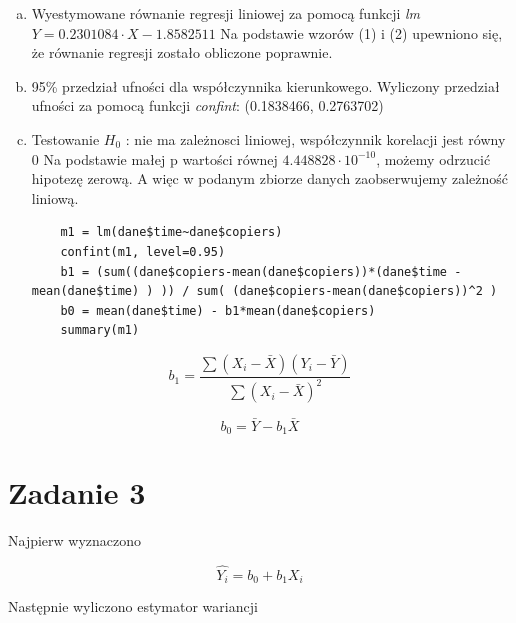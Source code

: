 \documentclass[9pt]{article}  %
\begin{document}
  \begin{enumerate}[a)]
    \item Wyestymowane równanie regresji liniowej za pomocą funkcji \textit{lm} \newline
    $ Y = 0.2301084 \cdot X - 1.8582511$ \newline
    Na podstawie wzorów (1) i (2) upewniono się, że równanie regresji zostało obliczone poprawnie.
    \item 95\% przedział ufności dla współczynnika kierunkowego.  \newline
    Wyliczony przedział ufności za pomocą funkcji \textit{confint}: \newline
    (0.1838466, 0.2763702) 
    \item Testowanie \newline
    $H_0$ : nie ma zależnosci liniowej, współczynnik korelacji jest równy 0 \newline
    Na podstawie małej p wartości równej $4.448828 \cdot 10^{-10}$, możemy odrzucić hipotezę zerową. A więc w podanym zbiorze danych zaobserwujemy zależność liniową. \newline
    
    
    \begin{lstlisting}
    m1 = lm(dane$time~dane$copiers)
    confint(m1, level=0.95)
    b1 = (sum((dane$copiers-mean(dane$copiers))*(dane$time - mean(dane$time) ) )) / sum( (dane$copiers-mean(dane$copiers))^2 )
    b0 = mean(dane$time) - b1*mean(dane$copiers)
    summary(m1)
    \end{lstlisting}  

  \end{enumerate}


  \begin{equation}
  b_1 = \frac{\sum{\left(X_i - \bar{X} \right) \left( Y_i - \bar{Y} \right) } }{\sum{\left(X_i - \bar{X} \right) ^2 } }
  \end{equation}

  \begin{equation}
  b_0 = \bar{Y} - b_1 \bar{X}
  \end{equation}

\section{Zadanie 3}

  Najpierw wyznaczono
  
  $$\hat{Y_i}  =b_0 +b_1 X_i$$
  
  Następnie wyliczono estymator wariancji
  
\end{document}

